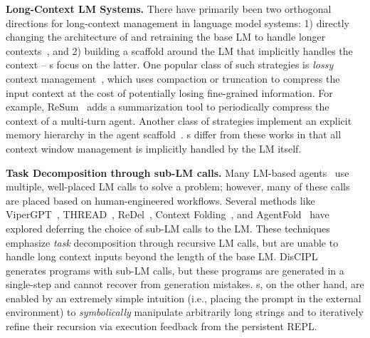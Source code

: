 \textbf{Long-Context LM Systems.} There have primarily been two orthogonal directions for long-context management in language model systems: 1) directly changing the architecture of and retraining the base LM to handle longer contexts~\citep{press2022trainshorttestlong, gu2022efficientlymodelinglongsequences, munkhdalai2024leavecontextbehindefficient}, and 2) building a scaffold around the LM that implicitly handles the context -- \RLM{}s focus on the latter. One popular class of such strategies is \textit{lossy} context management~\citep{chen2023walkingmemorymazecontext}, which uses compaction or truncation to compress the input context at the cost of potentially losing fine-grained information. For example, ReSum~\citep{wu2025resumunlockinglonghorizonsearch} adds a summarization tool to periodically compress the context of a multi-turn agent. Another class of strategies implement an explicit memory hierarchy in the agent scaffold~\citep{packer2024memgptllmsoperatingsystems, chhikara2025mem0buildingproductionreadyai,zhang2025gmemorytracinghierarchicalmemory}. \RLM{}s differ from these works in that all context window management is implicitly handled by the LM itself. 


\textbf{Task Decomposition through sub-LM calls.} Many LM-based agents~\citep{guo2024largelanguagemodelbased, anthropic_claude_code_subagents} use multiple, well-placed LM calls to solve a problem; however, many of these calls are placed based on human-engineered workflows. Several methods like ViperGPT~\citep{surismenon2023vipergpt}, THREAD~\citep{schroeder2025threadthinkingdeeperrecursive}, ReDel~\citep{zhu2024redel}, Context Folding~\citep{sun2025scalinglonghorizonllmagent}, and AgentFold~\citep{ye2025agentfoldlonghorizonwebagents} have explored deferring the choice of sub-LM calls to the LM. These techniques emphasize \textit{task} decomposition through recursive LM calls, but are unable to handle long context inputs beyond the length of the base LM. DisCIPL~\citep{grand2025self} generates programs with sub-LM calls, but these programs are generated in a single-step and cannot recover from generation mistakes. \RLM{}s, on the other hand, are enabled by an extremely simple intuition (i.e., placing the prompt in the external environment) to \textit{symbolically} manipulate arbitrarily long strings and to iteratively refine their recursion via execution feedback from the persistent REPL.
